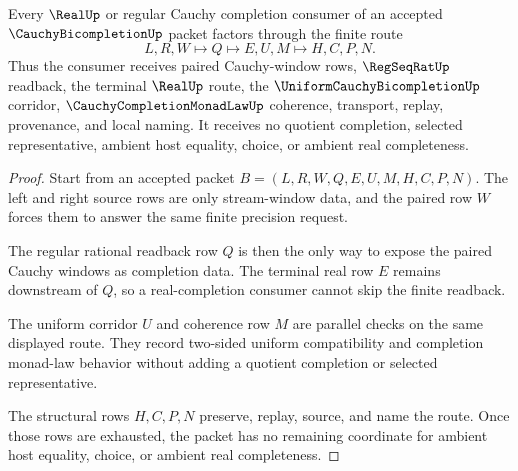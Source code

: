 \begin{theorem}
\label{thm:cauchy-bicompletion-real-completion-route}
Every $\RealUp$ or regular Cauchy completion consumer of an accepted $\CauchyBicompletionUp$ packet factors through the finite route
$$
L,R,W \longmapsto Q \longmapsto E,U,M \longmapsto H,C,P,N .
$$
Thus the consumer receives paired Cauchy-window rows, $\RegSeqRatUp$ readback, the terminal $\RealUp$ route, the $\UniformCauchyBicompletionUp$ corridor, $\CauchyCompletionMonadLawUp$ coherence, transport, replay, provenance, and local naming. It receives no quotient completion, selected representative, ambient host equality, choice, or ambient real completeness.
\end{theorem}
\begin{proof}
Start from an accepted packet $B=(L,R,W,Q,E,U,M,H,C,P,N)$. The left and right source rows are only stream-window data, and the paired row $W$ forces them to answer the same finite precision request.

The regular rational readback row $Q$ is then the only way to expose the paired Cauchy windows as completion data. The terminal real row $E$ remains downstream of $Q$, so a real-completion consumer cannot skip the finite readback.

The uniform corridor $U$ and coherence row $M$ are parallel checks on the same displayed route. They record two-sided uniform compatibility and completion monad-law behavior without adding a quotient completion or selected representative.

The structural rows $H,C,P,N$ preserve, replay, source, and name the route. Once those rows are exhausted, the packet has no remaining coordinate for ambient host equality, choice, or ambient real completeness.
\end{proof}



